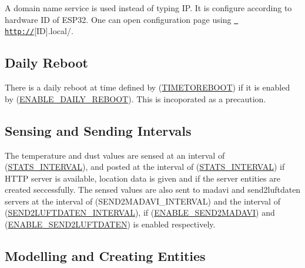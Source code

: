 A domain name service is used instead of typing IP. It is configure according to hardware ID of E\+S\+P32. One can open configuration page using \href{http://}{\texttt{ http\+://}}\mbox{[}ID\mbox{]}.local/.\hypertarget{index_dailyreboot}{}\subsection{Daily Reboot}\label{index_dailyreboot}
There is a daily reboot at time defined by (\mbox{\hyperlink{main_8h_a423126ae538bf9e83239e46e46cf1df9}{T\+I\+M\+E\+T\+O\+R\+E\+B\+O\+OT}}) if it is enabled by (\mbox{\hyperlink{main_8h_a18bdfe88e9f5895863740df7ad801109}{E\+N\+A\+B\+L\+E\+\_\+\+D\+A\+I\+L\+Y\+\_\+\+R\+E\+B\+O\+OT}}). This is incoporated as a precaution.\hypertarget{index_intervals}{}\subsection{Sensing and Sending Intervals}\label{index_intervals}
The temperature and dust values are sensed at an interval of (\mbox{\hyperlink{main_8h_aef6021251fa63b1e73a98864b809904e}{S\+T\+A\+T\+S\+\_\+\+I\+N\+T\+E\+R\+V\+AL}}), and posted at the interval of (\mbox{\hyperlink{main_8h_aef6021251fa63b1e73a98864b809904e}{S\+T\+A\+T\+S\+\_\+\+I\+N\+T\+E\+R\+V\+AL}}) if H\+T\+TP server is available, location data is given and if the server entities are created seccessfully. The sensed values are also sent to madavi and send2luftdaten servers at the interval of (S\+E\+N\+D2\+M\+A\+D\+A\+V\+I\+\_\+\+I\+N\+T\+E\+R\+V\+AL) and the interval of (\mbox{\hyperlink{main_8h_a7a63477c73052322ebb3ea6f1bfe7e1d}{S\+E\+N\+D2\+L\+U\+F\+T\+D\+A\+T\+E\+N\+\_\+\+I\+N\+T\+E\+R\+V\+AL}}), if (\mbox{\hyperlink{main_8h_a18d121e3e45bfea386799ad36fb70b5f}{E\+N\+A\+B\+L\+E\+\_\+\+S\+E\+N\+D2\+M\+A\+D\+A\+VI}}) and (\mbox{\hyperlink{main_8h_ace6bf58c74189bcd567c1135baaa9505}{E\+N\+A\+B\+L\+E\+\_\+\+S\+E\+N\+D2\+L\+U\+F\+T\+D\+A\+T\+EN}}) is enabled respectively. \hypertarget{index_create}{}\subsection{Modelling and Creating Entities}\label{index_create}
